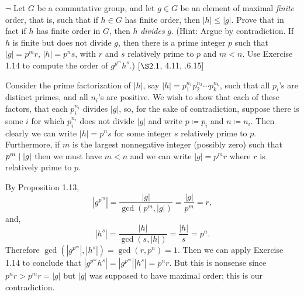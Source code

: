 \begin{exercise}
	$\neg$ Let $G$ be a commutative group, and let $g\in G$ be an element of maximal \emph{finite} order, that is, such that if $h\in G$ has finite order, then $|h|\leq |g|$. Prove that in fact if $h$ has finite order in $G$, then $h$ \emph{divides} $g$. (Hint: Argue by contradiction. If $h$ is finite but does not divide $g$, then there is a prime integer $p$ such that $|g| = p^mr$, $|h| = p^ns$, with $r$ and $s$ relatively prime to $p$ and $m < n$. Use Exercise 1.14 to compute the order of $g^{p^{m}}h^s$.) [$\S 2.1$, 4.11, .6.15]
\end{exercise}
\begin{solution}
	Consider the prime factorization of $|h|$, say  $|h|= p_1^{n_1}p_2^{n_2}\cdots p_k^{n_k}$, such that all $p_i$'s are distinct primes, and all $n_i$'s are positive. We wish to show that each of these factors, that each $p_i^{n_i}$ divides $|g|$, so, for the sake of contradiction, suppose there is some $i$ for which $p_i^{n_i}$ does not divide $|g|$ and write $p \coloneqq p_i$ and $n\coloneqq n_i$. Then clearly we can write $|h| = p^ns$ for some integer $s$ relatively prime to $p$. Furthermore, if $m$ is the largest nonnegative integer (possibly zero) such that $p^m \mid |g|$ then we must have $m<n$ and we can write $|g| = p^m r $ where $r$ is relatively prime to $p$.
	
	By Proposition 1.13, 
	\[
		|g^{p^m}| = \frac{|g|}{\gcd(p^m, |g|)} = \frac{|g|}{p^m} = r,
	\]
	and,
	\[
		|h^{s}| = \frac{|h|}{\gcd(s, |h|)} = \frac{|h|}{s} = p^n.
	\]
	Therefore $\gcd(|g^{p^m}|, |h^s|) = \gcd(r,p^n)  = 1$. Then we can apply Exercise 1.14 to conclude that $|g^{p^m}h^s| = |g^{p^m}||h^s| = p^nr$. But this is nonsense since $p^nr > p^mr = |g|$ but $|g|$ was supposed to have maximal order; this is our contradiction.
\end{solution}



